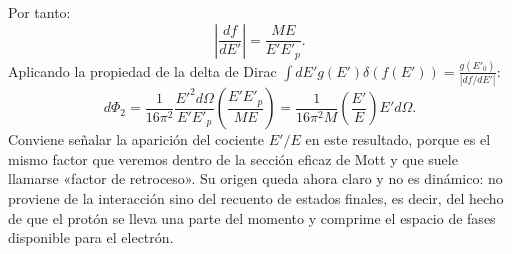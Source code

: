 \documentclass[10pt,a4paper]{article}
\begin{document}
Por tanto:
\begin{equation}
\left| \frac{df}{dE'} \right| = \frac{M E}{E' E'_p}.
\end{equation}
Aplicando la propiedad de la delta de Dirac $\int dE' g(E') \delta(f(E')) = \frac{g(E'_0)}{|df/dE'|}$:
\begin{equation}
d\Phi_2 = \frac{1}{16\pi^2} \frac{E'^2 d\Omega}{E' E'_p} \left( \frac{E' E'_p}{M E} \right) = \frac{1}{16\pi^2 M} \left( \frac{E'}{E} \right) E' d\Omega.
\end{equation}
Conviene señalar la aparición del cociente $E'/E$ en este resultado, porque es el mismo factor que veremos dentro de la sección eficaz de Mott y que suele llamarse «factor de retroceso». Su origen queda ahora claro y no es dinámico: no proviene de la interacción sino del recuento de estados finales, es decir, del hecho de que el protón se lleva una parte del momento y comprime el espacio de fases disponible para el electrón.
\end{document}
